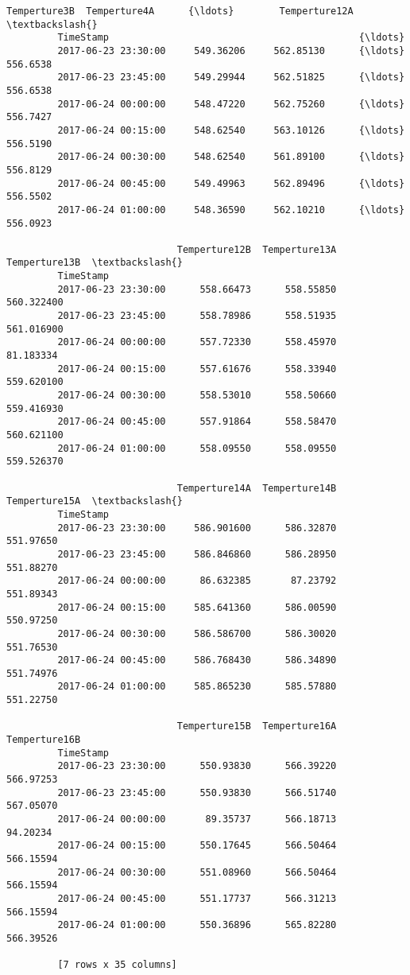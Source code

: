 \documentclass[11pt]{article}
\begin{document}
\begin{Verbatim}[commandchars=\\\{\}]
                              Temperture3B  Temperture4A      {\ldots}        Temperture12A  \textbackslash{}
         TimeStamp                                            {\ldots}                        
         2017-06-23 23:30:00     549.36206     562.85130      {\ldots}             556.6538   
         2017-06-23 23:45:00     549.29944     562.51825      {\ldots}             556.6538   
         2017-06-24 00:00:00     548.47220     562.75260      {\ldots}             556.7427   
         2017-06-24 00:15:00     548.62540     563.10126      {\ldots}             556.5190   
         2017-06-24 00:30:00     548.62540     561.89100      {\ldots}             556.8129   
         2017-06-24 00:45:00     549.49963     562.89496      {\ldots}             556.5502   
         2017-06-24 01:00:00     548.36590     562.10210      {\ldots}             556.0923   
         
                              Temperture12B  Temperture13A  Temperture13B  \textbackslash{}
         TimeStamp                                                          
         2017-06-23 23:30:00      558.66473      558.55850     560.322400   
         2017-06-23 23:45:00      558.78986      558.51935     561.016900   
         2017-06-24 00:00:00      557.72330      558.45970      81.183334   
         2017-06-24 00:15:00      557.61676      558.33940     559.620100   
         2017-06-24 00:30:00      558.53010      558.50660     559.416930   
         2017-06-24 00:45:00      557.91864      558.58470     560.621100   
         2017-06-24 01:00:00      558.09550      558.09550     559.526370   
         
                              Temperture14A  Temperture14B  Temperture15A  \textbackslash{}
         TimeStamp                                                          
         2017-06-23 23:30:00     586.901600      586.32870      551.97650   
         2017-06-23 23:45:00     586.846860      586.28950      551.88270   
         2017-06-24 00:00:00      86.632385       87.23792      551.89343   
         2017-06-24 00:15:00     585.641360      586.00590      550.97250   
         2017-06-24 00:30:00     586.586700      586.30020      551.76530   
         2017-06-24 00:45:00     586.768430      586.34890      551.74976   
         2017-06-24 01:00:00     585.865230      585.57880      551.22750   
         
                              Temperture15B  Temperture16A  Temperture16B  
         TimeStamp                                                         
         2017-06-23 23:30:00      550.93830      566.39220      566.97253  
         2017-06-23 23:45:00      550.93830      566.51740      567.05070  
         2017-06-24 00:00:00       89.35737      566.18713       94.20234  
         2017-06-24 00:15:00      550.17645      566.50464      566.15594  
         2017-06-24 00:30:00      551.08960      566.50464      566.15594  
         2017-06-24 00:45:00      551.17737      566.31213      566.15594  
         2017-06-24 01:00:00      550.36896      565.82280      566.39526  
         
         [7 rows x 35 columns]
\end{Verbatim}
            
\end{document}
